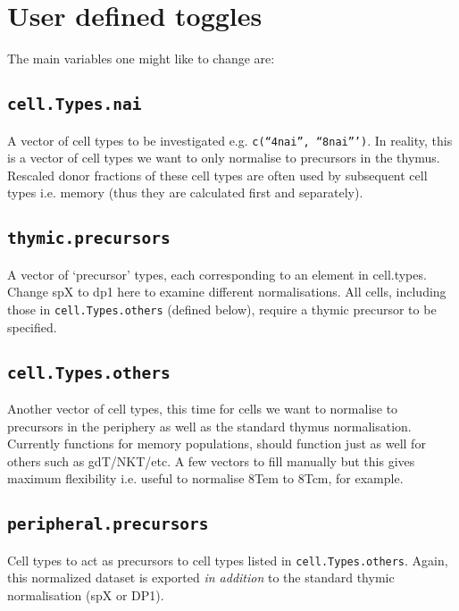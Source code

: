 \documentclass{tufte-book} %
\begin{document}
\section{User defined toggles}
The main variables one might like to change are:


\subsection{\texttt{cell.Types.nai}}
 A vector of cell types to be investigated e.g. \texttt{c(``4nai'', ``8nai''')}. In reality, this is a vector of cell types we want to only normalise to precursors in the thymus. Rescaled donor fractions of these cell types are often used by subsequent cell types i.e. memory (thus they are calculated first and separately).

\subsection{\texttt{thymic.precursors}} 
 A vector of `precursor' types, each corresponding to an element in cell.types. Change spX to dp1 here to examine different normalisations. All cells, including those in \texttt{cell.Types.others} (defined below), require a thymic precursor to be specified. 

\subsection{\texttt{cell.Types.others}} 
Another vector of cell types, this time for cells we want to normalise to precursors in the periphery as well as the standard thymus normalisation. Currently functions for memory populations, should function just as well for others such as gdT/NKT/etc. A few vectors to fill manually but this gives maximum flexibility i.e. useful to normalise 8Tem to 8Tcm, for example.

\subsection{\texttt{peripheral.precursors}}
Cell types to act as precursors to cell types listed in \texttt{cell.Types.others}. Again, this normalized dataset is exported \textit{in addition} to the standard thymic normalisation (spX or DP1).
\end{document}
